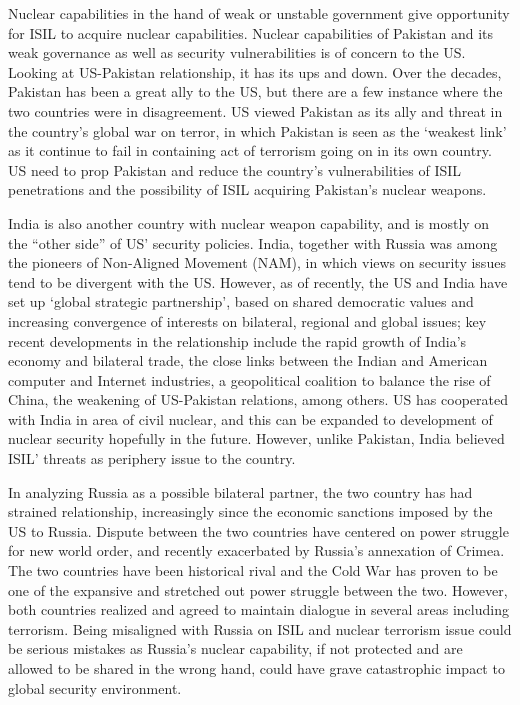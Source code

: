 \documentclass{report}
\begin{document}
Nuclear capabilities in the hand of weak or unstable government give opportunity for ISIL to acquire nuclear capabilities. Nuclear capabilities of Pakistan and its weak governance as well as security vulnerabilities is of concern to the US. Looking at US-Pakistan relationship, it has its ups and down. Over the decades, Pakistan has been a great ally to the US, but there are a few instance where the two countries were in disagreement. US viewed Pakistan as its ally and threat in the country’s global war on terror, in which Pakistan is seen as the ‘weakest link’ as it continue to fail in containing act of terrorism going on in its own country. US need to prop Pakistan and reduce the country’s vulnerabilities of ISIL penetrations and the possibility of ISIL acquiring Pakistan’s nuclear weapons.

India is also another country with nuclear weapon capability, and is mostly on the \enquote{other side} of US’ security policies. India, together with Russia was among the pioneers of Non-Aligned Movement (NAM), in which views on security issues tend to be divergent with the US. However, as of recently, the US and India have set up ‘global strategic partnership’, based on shared democratic values and increasing convergence of interests on bilateral, regional and global issues; key recent developments in the relationship include the rapid growth of India's economy and bilateral trade, the close links between the Indian and American computer and Internet industries, a geopolitical coalition to balance the rise of China, the weakening of US-Pakistan relations, among others. US has cooperated with India in area of civil nuclear, and this can be expanded to development of nuclear security hopefully in the future. However, unlike Pakistan, India believed ISIL’ threats as periphery issue to the country.

In analyzing Russia as a possible bilateral partner, the two country has had strained relationship, increasingly since the economic sanctions imposed by the US to Russia. Dispute between the two countries have centered on power struggle for new world order, and recently exacerbated by Russia’s annexation of Crimea. The two countries have been historical rival and the Cold War has proven to be one of the expansive and stretched out power struggle between the two. However, both countries realized and agreed to maintain dialogue in several areas including terrorism. Being misaligned with Russia on ISIL and nuclear terrorism issue could be serious mistakes as Russia’s nuclear capability, if not protected and are allowed to be shared in the wrong hand, could have grave catastrophic impact to global security environment.
\end{document}

